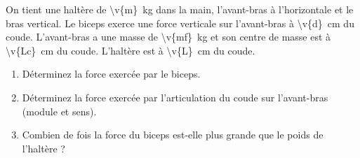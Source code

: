 On tient une haltère de \qty{\v{m}}{kg} dans la main, l'avant-bras à l'horizontale et le bras vertical. Le biceps exerce une force verticale sur l'avant-bras à \qty{\v{d}}{cm} du coude. L'avant-bras a une masse de \qty{\v{mf}}{kg} et son centre de masse est à \qty{\v{Lc}}{cm} du coude. L'haltère est à \qty{\v{L}}{cm} du coude.

\begin{enumerate}[label=\alph*)]
    \item Déterminez la force exercée par le biceps.
    \item Déterminez la force exercée par l'articulation du coude sur l'avant-bras (module et sens).
    \item Combien de fois la force du biceps est-elle plus grande que le poids de l'haltère ?
\end{enumerate}
